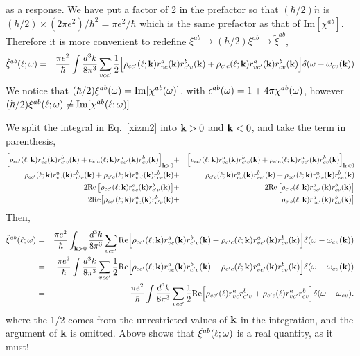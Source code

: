 \documentclass[floatfix,prb,aps,superscriptaddress,11pt]{revtex4}
\begin{document}
as a response. We have put a factor of 2 in the prefactor so that 
$(\hbar/2)\dot n$ is 
$(\hbar/2)\times (2\pi e^2)/\hbar^2=\pi e^2/\hbar$ which is the same
prefactor as that of Im$[\chi^{ab}]$. Therefore it is more convenient to
redefine $\xi^{ab}\to (\hbar/2)\xi^{ab}\to\tilde\xi^{ab}$,  
\begin{eqnarray}\label{xizm2}
\tilde\xi^{ab}(\ell;\omega)&=&
\frac{\pi e^2}{\hbar}
\int\frac{d^3k}{8\pi^3}
\sum_{vcc'}
\frac{1}{2}\Big[
\rho_{cc'}(\ell;\mathbf{k})     
r^a_{vc} 
(\mathbf{k})   
r^b_{c'v}
(\mathbf{k})
+
\rho_{c'c}(\ell;\mathbf{k})  
r^a_{vc'} 
(\mathbf{k})   
r^b_{cv}
(\mathbf{k})
\Big]
\delta(\omega-\omega_{cv}(\mathbf{k})
)
\end{eqnarray}      
We notice that $(\hbar/2)\xi^{ab}(\omega)=\mathrm{Im}[\chi^{ab}(\omega)]$, with
$\epsilon^{ab}(\omega)=1+4\pi\chi^{ab}(\omega)$, however 
$(\hbar/2)\xi^{ab}(\ell;\omega)\neq\mathrm{Im}[\chi^{ab}(\ell;\omega)]$

We split the integral in Eq.~\eqref{xizm2} into $\mathbf{k}>0$ and $\mathbf{k}<0$,
and take the term in parenthesis,
\begin{eqnarray}\label{p1}
\Big[
\rho_{cc'}(\ell;\mathbf{k})   
r^a_{vc} 
(\mathbf{k}) 
r^b_{c'v}
(\mathbf{k})
+
\rho_{c'c}(\ell;\mathbf{k})
r^a_{vc'} 
(\mathbf{k}) 
r^b_{cv}
(\mathbf{k})
\Big]_{\mathbf{k}>0}
&+&
\Big[
\rho_{cc'}(\ell;\mathbf{k})   
r^a_{vc} 
(\mathbf{k}) 
r^b_{c'v}
(\mathbf{k})
+
\rho_{c'c}(\ell;\mathbf{k})
r^a_{vc'} 
(\mathbf{k}) 
r^b_{cv}
(\mathbf{k})
\Big]_{\mathbf{k}<0}
\nonumber\\
\rho_{cc'}(\ell;\mathbf{k})   
r^a_{vc} 
(\mathbf{k}) 
r^b_{c'v}
(\mathbf{k})
+
\rho_{c'c}(\ell;\mathbf{k})
r^a_{vc'} 
(\mathbf{k}) 
r^b_{cv}
(\mathbf{k})
&+&
\rho_{c'c}(\ell;\mathbf{k})   
r^a_{cv} 
(\mathbf{k}) 
r^b_{vc'}
(\mathbf{k})
+
\rho_{cc'}(\ell;\mathbf{k})
r^a_{c'v} 
(\mathbf{k}) 
r^b_{vc}
(\mathbf{k})
\nonumber\\
2\mathrm{Re}\left[\rho_{cc'}(\ell;\mathbf{k})   
r^a_{vc} 
(\mathbf{k}) 
r^b_{c'v}
(\mathbf{k})
\right]
&+&
2\mathrm{Re}\left[
\rho_{c'c}(\ell;\mathbf{k})
r^a_{vc'} 
(\mathbf{k}) 
r^b_{cv}
(\mathbf{k})
\right]
\nonumber\\
2\mathrm{Re}\big[
\rho_{cc'}(\ell;\mathbf{k})   
r^a_{vc} 
(\mathbf{k}) 
r^b_{c'v}
(\mathbf{k})
&+&
\rho_{c'c}(\ell;\mathbf{k})
r^a_{vc'} 
(\mathbf{k}) 
r^b_{cv}
(\mathbf{k})
\big]
\nonumber
\end{eqnarray}    
Then,
\begin{eqnarray}\label{xizm3}
\tilde\xi^{ab}(\ell;\omega)
&=&
\frac{\pi e^2}{\hbar}
\int_{\mathbf{k}>0}\frac{d^3k}{8\pi^3}
\sum_{vcc'}
\mathrm{Re}\Big[
\rho_{cc'}(\ell;\mathbf{k})    
r^a_{vc} 
(\mathbf{k})  
r^b_{c'v}
(\mathbf{k})
+
\rho_{c'c}(\ell;\mathbf{k}) 
r^a_{vc'} 
(\mathbf{k})  
r^b_{cv}
(\mathbf{k})
\Big]
\delta(\omega-\omega_{cv}(\mathbf{k})
)
\nonumber\\
&=&
\frac{\pi e^2}{\hbar}
\int\frac{d^3k}{8\pi^3}
\sum_{vcc'}
\frac{1}{2}\mathrm{Re}\Big[
\rho_{cc'}(\ell;\mathbf{k})    
r^a_{vc} 
(\mathbf{k})  
r^b_{c'v}
(\mathbf{k})
+
\rho_{c'c}(\ell;\mathbf{k}) 
r^a_{vc'} 
(\mathbf{k})  
r^b_{cv}
(\mathbf{k})
\Big]
\delta(\omega-\omega_{cv}(\mathbf{k})
)
\nonumber\\
&=&
\frac{\pi e^2}{\hbar}
\int\frac{d^3k}{8\pi^3}
\sum_{vcc'}
\frac{1}{2}\mathrm{Re}\Big[
\rho_{cc'}(\ell)    
r^a_{vc} 
r^b_{c'v}
+
\rho_{c'c}(\ell) 
r^a_{vc'} 
r^b_{cv}
\Big]
\delta(\omega-\omega_{cv})
.
\end{eqnarray}     
where the 1/2 comes from the unrestricted values of $\mathbf{k}$ in the
integration, and the argument of $\mathbf{k}$ is omitted.  
Above shows that $\tilde\xi^{ab}(\ell;\omega)$ is a real quantity, as it must!
\end{document}
